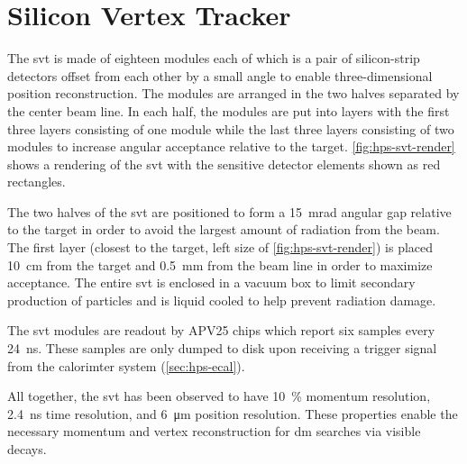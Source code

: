 \section{Silicon Vertex Tracker}
The \ac{svt} is made of eighteen modules each of which is a pair of silicon-strip detectors
offset from each other by a small angle to enable three-dimensional position reconstruction.
The modules are arranged in the two halves separated by the center beam line. In each half,
the modules are put into layers with the first three layers consisting of one module while
the last three layers consisting of two modules to increase angular acceptance relative
to the target. \cref{fig:hps-svt-render} shows a rendering of the \ac{svt} with the sensitive
detector elements shown as red rectangles.

The two halves of the \ac{svt} are positioned to form a \qty{15}{\milli\radian} angular gap relative
to the target in order to avoid the largest amount of radiation from the beam. The first layer
(closest to the target, left size of \cref{fig:hps-svt-render}) is placed \qty{10}{\cm} from
the target and \qty{0.5}{\mm} from the beam line in order to maximize acceptance. The entire
\ac{svt} is enclosed in a vacuum box to limit secondary production of particles and is liquid
cooled to help prevent radiation damage.

The \ac{svt} modules are readout by APV25 chips which report six samples every \qty{24}{\ns}.
These samples are only dumped to disk upon receiving a trigger signal from the calorimter
system (\cref{sec:hps-ecal}).

All together, the \ac{svt} has been observed to have \num{10}~\% momentum resolution,
\qty{2.4}{\ns} time resolution, and \qty{6}{\micro\meter} position resolution. These
properties enable the necessary momentum and vertex reconstruction for \ac{dm} searches
via visible decays.

